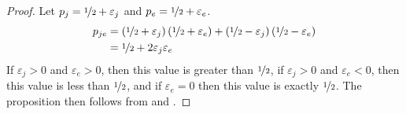 \documentclass[letterpaper]{article} %
\newcommand{\judge}{\ensuremath{j} }
\newcommand{\expert}{\ensuremath{e} }
\begin{document}
 \begin{proof}
 Let $p_\judge = \nicefrac{1}{2} + \varepsilon_\judge$ and $p_\expert = \nicefrac{1}{2} + \varepsilon_\expert$.
\small
 \begin{align*}
 p_{\judge \expert} & = \left(\nicefrac{1}{2} + \varepsilon_\judge \right) \left(\nicefrac{1}{2} + \varepsilon_\expert \right) + \left(\nicefrac{1}{2} - \varepsilon_\judge \right) \left(\nicefrac{1}{2} - \varepsilon_\expert \right)\\
 & = \nicefrac{1}{2} + 2 \varepsilon_\judge \varepsilon_\expert \label{Eq:11}
 \end{align*}
\normalsize
 If $\varepsilon_\judge > 0$ and $\varepsilon_\expert > 0$, then this value is greater than $\nicefrac{1}{2}$, if $\varepsilon_\judge > 0$ and $\varepsilon_\expert < 0$, then this value is less than $\nicefrac{1}{2}$, and if $\varepsilon_\expert = 0$ then this value is exactly $\nicefrac{1}{2}$. The proposition then follows from  and .
 \end{proof}
\end{document}
